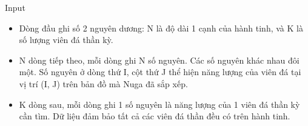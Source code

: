 Input
\begin{itemize}
	\item     Dòng đầu ghi số 2 nguyên dương: N là độ dài 1 cạnh của hành tinh, và K là số lượng viên đá thần kỳ.   
	\item     N dòng tiếp theo, mỗi dòng ghi N số nguyên. Các số nguyên khác nhau đôi một. Số nguyên ở dòng thứ I, cột thứ J thể hiện năng lượng của viên đá tại vị trí (I, J) trên bản đồ mà Nuga đã sắp xếp.   
	\item     K dòng sau, mỗi dòng ghi 1 số nguyên là năng lượng của 1 viên đá thần kỳ cần tìm. Dữ liệu đảm bảo tất cả các viên đá thần đều có trên hành tinh.   
\end{itemize}